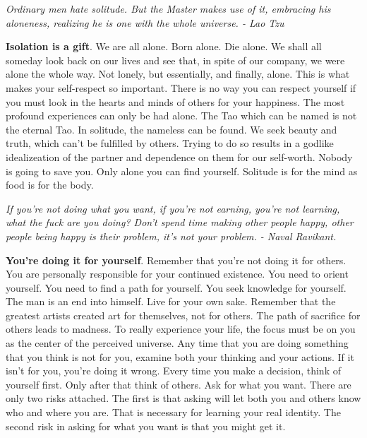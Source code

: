 \documentclass[a4paper,hidelinks]{article}
\begin{document}
\newpage

\begin{center}
\textit{Ordinary men hate solitude. But the Master makes use of it, embracing his aloneness, realizing he is one with the whole universe. - Lao Tzu}
\end{center}

\textbf{Isolation is a gift}.
We are all alone.
Born alone.
Die alone.
We shall all someday look back on our lives and see that, in spite of our company, we were alone the whole way.
Not lonely, but essentially, and finally, alone.
This is what makes your self-respect so important.
There is no way you can respect yourself if you must look in the hearts and minds of others for your happiness.
The most profound experiences can only be had alone.
The Tao which can be named is not the eternal Tao.
In solitude, the nameless can be found.
We seek beauty and truth, which can't be fulfilled by others.
Trying to do so results in a godlike idealizeation of the partner and dependence on them for our self-worth.
Nobody is going to save you.
Only alone you can find yourself.
Solitude is for the mind as food is for the body.

\newpage

\begin{center}
\textit{If you're not doing what you want, if you're not earning, you're not learning, what the fuck are you doing? Don't spend time making other people happy, other people being happy is their problem, it's not your problem. - Naval Ravikant.}
\end{center}

\textbf{You're doing it for yourself}.
Remember that you're not doing it for others.
You are personally responsible for your continued existence.
You need to orient yourself.
You need to find a path for yourself.
You seek knowledge for yourself.
The man is an end into himself.
Live for your own sake.
Remember that the greatest artists created art for themselves, not for others.
The path of sacrifice for others leads to madness.
To really experience your life, the focus must be on you as the center of the perceived universe.
Any time that you are doing something that you think is not for you, examine both your thinking and your actions.
If it isn't for you, you’re doing it wrong.
Every time you make a decision, think of yourself first.
Only after that think of others.
Ask for what you want.
There are only two risks attached.
The first is that asking will let both you and others know who and where you are.
That is necessary for learning your real identity.
The second risk in asking for what you want is that you might get it.
\end{document}
